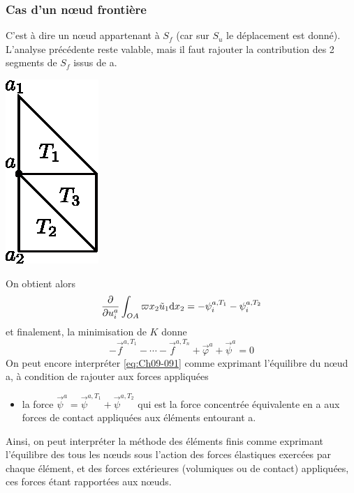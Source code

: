 \subsubsection{Cas d'un nœud frontière}
\begin{multicols}{2}
C'est à dire un nœud appartenant à $S_f$ (car sur $S_u$ le déplacement est donné).
L'analyse précédente reste valable, mais il faut rajouter la contribution des 2 segments de $S_f$ issus de a.
\columnbreak
\begin{center}
    \includegraphics{../images/T1_Ch09-13}
\end{center}
\end{multicols}
On obtient alors 
\begin{equation}
    \frac{\partial}{\partial u_i^a} \int_{OA} \varpi x_2 \tilde{u}_1 \mathrm{d} x_2 = - \psi_i^{a,T_1} - \psi_i^{a,T_2}
    \label{eq:Ch09-090}
\end{equation}
et finalement, la minimisation de $K$ donne 
\begin{equation}
    -\vec{f}^{a,T_1} - \cdots -\vec{f}^{a,T_n} + \vec{\varphi}^a + \vec{\psi}^a = 0 
    \label{eq:Ch09-091}
\end{equation}
On peut encore interpréter \eqref{eq:Ch09-091} comme exprimant l'équilibre du nœud a, à condition de rajouter aux forces appliquées
\begin{itemize}
    \item la force $\vec{\psi}^a = \vec{\psi}^{a,T_1}+ \vec{\psi}^{a,T_2}$ qui est la force concentrée équivalente en a aux forces de contact appliquées aux éléments entourant a. 
\end{itemize}

Ainsi, on peut interpréter la méthode des éléments finis comme exprimant l'équilibre des tous les nœuds sous l'action des forces élastiques exercées par chaque élément, et des forces extérieures (volumiques ou de contact) appliquées, ces forces étant rapportées aux nœuds. 
